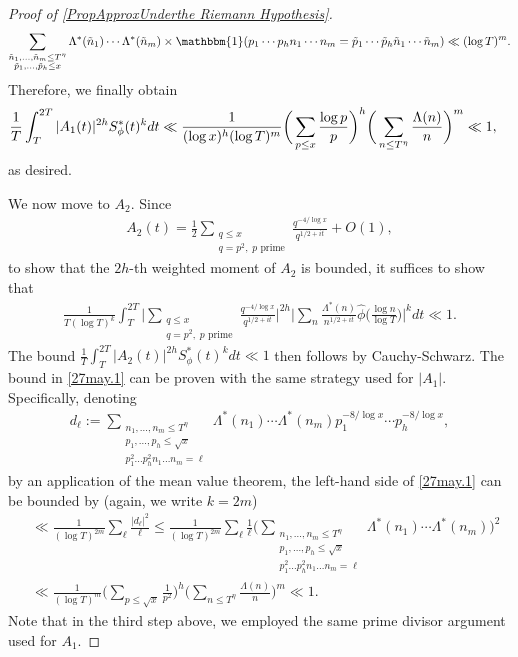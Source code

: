 \documentclass[12pt,oneside,english,a4paper]{amsart}
\theoremstyle{remark}
\numberwithin{equation}{section}
\newcommand{\Starphi}{S_\phi^*}
\begin{document}
\begin{proof}[Proof of \cref{PropApproxUnderthe Riemann Hypothesis}]
    \[ \sum_{\substack{ \tilde n_1,\dots,\tilde n_m \leq T^\eta \\ \tilde p_1,\dots,\tilde p_h \leq x}} \Lambda^*(\tilde n_1) \cdots \Lambda^*(\tilde n_m) \times \mathbbm{1}(p_1\cdots p_hn_1\cdots n_m = \tilde p_1\cdots \tilde p_h \tilde n_1\cdots \tilde n_m) \ll (\log T)^m.\]
    Therefore, we finally obtain
    \begin{align*}
        &\notag\frac{1}{T}\int_T^{2T} |A_1(t)|^{2h} \Starphi(t)^{k}  dt
        \ll \frac{1}{(\log x)^h (\log T)^{m}}  \bigg(\sum_{p\leq x } \frac{\log p}{p} \bigg)^h \bigg( \sum_{n \leq T^\eta}
        \frac{\Lambda(n)}{n}\bigg)^m 
        \ll 1,
    \end{align*}
    as desired.

    We now move to $A_2$. Since
    \begin{align*}
        A_2(t)=\frac{1}{2}\sum_{\substack{q\leq x\\ q=p^2, \; p \text{ prime}}} \frac{q^{-4/\log x}} {q^{1/2+it}}+ O(1),
    \end{align*}
    to show that the $2h$-th weighted moment of $A_2$ is bounded, it suffices to show that
    \begin{align}\label{27may.1}
        \frac{1}{T(\log T)^{k}} \int_T^{2T} \bigg|\sum_{\substack{q\leq x\\ q=p^2, \; p \text{ prime}}} \frac{q^{-4/\log x}} {q^{1/2+it}} \bigg|^{2h} 
        \bigg| \sum_{n} \frac{\Lambda^*(n)}{n^{1/2+it}} \hat\phi \bigg(\frac{\log n}{\log T} \bigg) \bigg|^{k} dt 
        \ll 1. 
    \end{align}
    The bound $\frac{1}{T}\int_T^{2T} |A_2(t)|^{2h} \Starphi(t)^kdt \ll 1$ then follows by Cauchy-Schwarz.
    The bound in \eqref{27may.1} can be proven with the same strategy used for $|A_1|$. Specifically, denoting
    \begin{align*}
        d_\ell:=
        \sum_{\substack{ n_1,\dots,n_m\leq T^\eta \\ p_1,\dots,p_h\leq \sqrt{x} \\ p_1^2 \dots p_h^2 n_1\dots n_m=\ell}}
        \Lambda^*(n_1)\cdots \Lambda^*(n_m) p_1^{-8/\log x} \cdots p_h^{-8/\log x},
    \end{align*}
    by an application of the mean value theorem, the left-hand side of \eqref{27may.1} can be bounded by (again, we write $k=2m$)
    \begin{align*}
        &\ll \frac{1}{(\log T)^{2m}} \sum_{\ell} \frac{|d_\ell|^2}{\ell}
        \leq \frac{1}{(\log T)^{2m}} \sum_{\ell} \frac{1}{\ell} \bigg( \sum_{\substack{ n_1,\dots,n_m\leq T^\eta \\ p_1,\dots,p_h\leq \sqrt{x} \\ p_1^2 \dots p_h^2 n_1\dots n_m=\ell}}\Lambda^*(n_1)\cdots \Lambda^*(n_m)\bigg)^2 \\
        &\ll \frac{1}{(\log T)^{m}} \bigg(\sum_{p \leq \sqrt{x} } \frac{1}{p^2}\bigg)^h \bigg( \sum_{n\leq T^\eta} \frac{\Lambda(n)}{n}\bigg)^{m} \ll 1.
    \end{align*}
    Note that in the third step above, we employed the same prime divisor argument used for $A_1$.


\end{proof}
\end{document}
